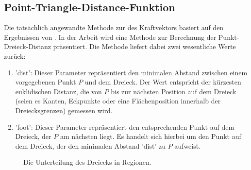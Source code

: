 \documentclass[conference]{IEEEtran}
\begin{document}
\subsection{Point-Triangle-Distance-Funktion}\label{dist}
Die tatsächlich angewandte Methode zur des Kraftvektors basiert auf den Ergebnissen 
von . In der Arbeit wird eine Methode zur Berechnung der Punkt-Dreieck-Distanz präsentiert. Die Methode liefert dabei zwei wesentliche Werte zurück:

\begin{enumerate}
\item 'dist': Dieser Parameter repräsentiert den minimalen Abstand zwischen einem vorgegebenen Punkt $P$ und dem Dreieck. Der Wert entspricht der kürzesten euklidischen Distanz, die von $P$ bis zur nächsten Position auf dem Dreieck (seien es Kanten, Eckpunkte oder eine Flächenposition innerhalb der Dreiecksgrenzen) 
gemessen wird.
\item 'foot': Dieser Parameter repräsentiert den entsprechenden Punkt auf dem Dreieck, der $P$ am nächsten liegt. Es handelt sich hierbei um den Punkt auf dem Dreieck, der den minimalen Abstand 'dist' zu $P$ aufweist.
\end{enumerate}


\begin{figure}[h] 
    \centering
    \caption{Die Unterteilung des Dreiecks in Regionen.}
    \label{fig:regions}
\end{figure}
\end{document}
